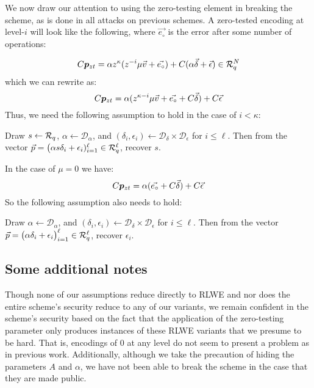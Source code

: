We now draw our attention to using the zero-testing element in breaking the scheme, as is done in all attacks on previous schemes.  A zero-tested encoding at level-$i$ will look like the following, where $\vec{e_{\circ}}$ is the error after some number of operations:

$$C \bm{p}_{zt} = \alpha z^{\kappa}(z^{-i} \mu \vec{v} + \vec{e_{\circ}}) + C(\alpha\vec{\delta} + \vec{\epsilon}) \in \mathcal{R}_q^N$$
which we can rewrite as:
$$C\bm{p}_{zt} = \alpha (z^{\kappa - i}\mu \vec{v} + \vec{e_{\circ}} + C\vec{\delta}) + C\vec{\epsilon}$$
Thus, we need the following assumption to hold in the case of $i < \kappa$:
\begin{assumption}
\label{rlwevar2}
Draw $s \leftarrow \mathcal{R}_q$, $\alpha \leftarrow \mathcal{D}_\alpha$, and $(\delta_i, \epsilon_i) \leftarrow \mathcal{D}_\delta \times \mathcal{D}_\epsilon$ for $i \leq \ell$.  Then from the vector $\vec{p} = \big(\alpha s \delta_i + \epsilon_i)_{i=1}^{\ell} \in \mathcal{R}_q^\ell$, recover $s$.\\
\end{assumption}

In the case of $\mu = 0$ we have:
\begin{equation}\label{eq:topleveltested}
C\bm{p}_{zt} = \alpha (\vec{e_{\circ}} + C\vec{\delta}) + C\vec{\epsilon}
\end{equation}
So the following assumption also needs to hold:
\begin{assumption}
\label{rlwevar3}
Draw $\alpha \leftarrow \mathcal{D}_\alpha$, and $(\delta_i, \epsilon_i) \leftarrow \mathcal{D}_\delta \times \mathcal{D}_\epsilon$ for $i \leq \ell$.  Then from the vector $\vec{p} = \big(\alpha \delta_i + \epsilon_i\big)_{i=1}^{\ell} \in \mathcal{R}_q^\ell$, recover $\epsilon_i$.\\
\end{assumption}

\subsection{Some additional notes}

Though none of our assumptions reduce directly to RLWE and nor does the entire scheme's security reduce to any of our variants, we remain confident in the scheme's security based on the fact that the application of the zero-testing parameter only produces instances of these RLWE variants that we presume to be hard.  That is, encodings of $0$ at any level do not seem to present a problem as in previous work.  Additionally, although we take the precaution of hiding the parameters $A$ and $\alpha$, we have not been able to break the scheme in the case that they are made public. 
